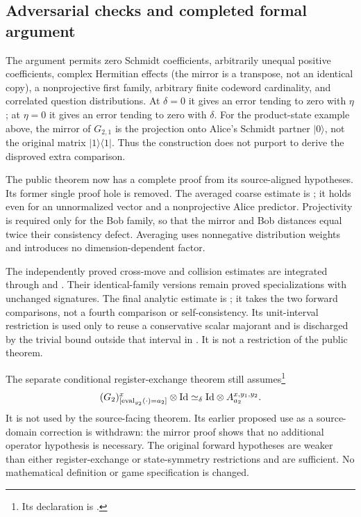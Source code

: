 \documentclass[11pt]{article}
\begin{document}
\subsection*{Adversarial checks and completed formal argument}

The argument permits zero Schmidt coefficients, arbitrarily unequal positive
coefficients, complex Hermitian effects (the mirror is a transpose, not an
identical copy), a nonprojective first family, arbitrary finite codeword
cardinality, and correlated question distributions. At $\delta=0$ it gives
an error tending to zero with $\eta$; at $\eta=0$ it gives an error tending to
zero with $\delta$. For the product-state example above, the mirror of
$G_{2,1}$ is the projection onto Alice's Schmidt partner $|0\rangle$, not the
original matrix $|1\rangle\langle1|$. Thus the construction does not purport
to derive the disproved extra comparison.

The public theorem  now has a complete proof
from its source-aligned hypotheses. Its former single proof hole is removed.
The averaged coarse estimate is
; it holds even for an
unnormalized vector and a nonprojective Alice predictor. Projectivity is
required only for the Bob family, so that the mirror and Bob distances equal
twice their consistency defect. Averaging uses nonnegative distribution
weights and introduces no dimension-dependent factor.

The independently proved cross-move and collision estimates are integrated
through  and
.
Their identical-family versions remain proved specializations with unchanged
signatures. The final analytic estimate is
; it takes the
two forward comparisons, not a fourth comparison or self-consistency.
Its unit-interval restriction is used only to reuse a conservative scalar
majorant and is discharged by the trivial bound outside that interval in
. It is not a restriction of the public theorem.

The separate conditional register-exchange theorem still
assumes\footnote{Its declaration is
.}
\begin{equation}\label{eq:pasting-1-sym}
 (G_2)^x_{[\operatorname{eval}_{y_2}(\cdot)=a_2]}\otimes\mathrm{Id}
 \simeq_\delta\mathrm{Id}\otimes A^{x,y_1,y_2}_{a_2}.
\end{equation}
It is not used by the source-facing theorem. Its earlier proposed use as a
source-domain correction is withdrawn: the mirror proof shows that no
additional operator hypothesis is necessary. The original forward hypotheses
are weaker than either register-exchange or state-symmetry restrictions and
are sufficient. No mathematical definition or game specification is changed.
\end{document}
